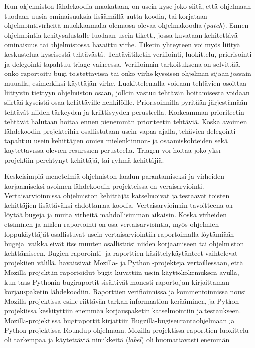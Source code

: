 \documentclass[utf8]{gradu3}
\begin{document}
Kun ohjelmiston lähdekoodia muokataan, on usein kyse joko siitä, että ohjelmaan
tuodaan uusia ominaisuuksia lisäämällä uutta koodia, tai korjataan
ohjelmointivirheitä muokkaamalla olemassa olevaa ohjelmakoodia (\textit{patch}).
Ennen ohjelmointia kehitysalustalle luodaan usein tiketti, jossa kuvataan
kehitettävä ominaisuus tai ohjelmistossa havaittu virhe. Tiketin yhteyteen voi
myös liittyä keskustelua kyseisestä tehtävästä.%
Tehtävätiketin verifiointi, luokittelu, priorisointi ja delegointi tapahtuu
triage-vaiheessa.%
Verifioinnin tarkoituksena on selvittää, onko raportoitu bugi toistettavissa tai
onko virhe kyseisen ohjelman sijaan jossain muualla, esimerkiksi käyttäjän
virhe.%
Luokittelemalla voidaan tehtävien osoittaa liittyvän tiettyyn ohjelmiston osaan,
jolloin vastuu tehtävän hoitamisesta voidaan siirtää kyseistä osaa kehittäville
henkilöille.%
Priorisoinnilla pyritään järjestämään tehtävät niiden tärkeyden ja kriittisyyden
perusteella. Korkeamman prioriteetin tehtävät halutaan hoitaa ennen pienemmän
prioriteetin tehtäviä.%
Koska avoimen lähdekoodin projekteihin osallistutaan usein vapaa-ajalla,
tehävien delegointi tapahtuu usein kehittäjien omien mielenkiinnon- ja
osaamiskohteiden sekä käytettävissä olevien resurssien perusteella.%
Triagen voi hoitaa joko yksi projektiin perehtynyt kehittäjä, tai ryhmä
kehittäjiä. 

Keskeisimpiä menetelmiä ohjelmiston laadun parantamiseksi ja virheiden
korjaamiseksi avoimen lähdekoodin projekteissa on veraisarviointi.
Vertaisarvioinnissa ohjelmiston kehittäjät katselmoivat ja testaavat toisten
kehittäjien lisättäväksi ehdottamaa koodia. Vertaisarvioinnin tavoitteena on
löytää bugeja ja muita virheitä mahdollisimman aikaisin. Koska virheiden
etsiminen ja niiden raportointi on osa vertaisarviointia, myös ohjelmien
loppukäyttäjät osallistuvat usein vertaisarviointiin raportoimalla löytämiään
bugeja, vaikka eivät itse muuten osallistuisi niiden korjaamiseen tai
ohjelmiston kehttämiseen. Bugien raporointi- ja raporttien käsittelykäytänteet
vaihtelevat projektien välillä. \textcite{Wang-2015} havaitsivat Mozilla- ja
Python -projekteja vertaillessaan, että Mozilla-projektiin raportoidut bugit
kuvattiin usein käyttökokemuksen avulla, kun taas Pythonin bugiraportit
sisältivät monesti raportoijan kirjoittaman korjauspaketin lähdekoodiin.
Raporttien verifioinnissa ja kommentoinnissa nousi Mozilla-projektissa esille
riittävän tarkan informaation kerääminen, ja Python-projektissa keskityttiin
enemmän korjauspaketin katselmointiin ja testaukseen. Mozilla-projektissa
bugiraportit kirjattiin Bugzilla-bugiseurantaohjelmaan ja Python projektissa
Roundup-ohjelmaan. Mozilla-projektissa raporttien luokittelu oli tarkempaa ja
käytettäviä nimikkeitä (\textit{label}) oli huomattavasti enemmän.
\parencite{Wang-2015} 
\end{document}

